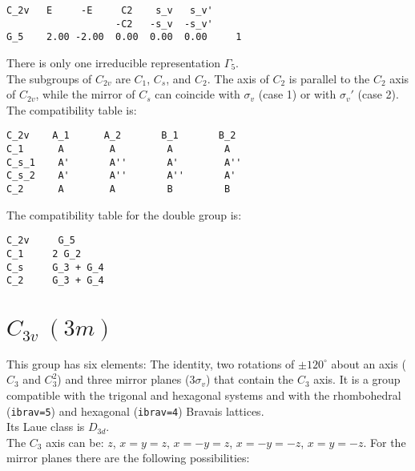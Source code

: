 \documentclass[12pt,a4paper,twoside]{report}
\begin{document}
\begin{tcolorbox}
\begin{footnotesize}
\begin{verbatim}
C_2v   E     -E     C2    s_v   s_v'
                   -C2   -s_v  -s_v'
G_5    2.00 -2.00  0.00  0.00  0.00     1
\end{verbatim}
\end{footnotesize}
\end{tcolorbox}

There is only one irreducible representation $\Gamma_5$. \\
The subgroups of $C_{2v}$ are $C_1$, $C_s$, and $C_2$. The axis of $C_2$ is 
parallel to the $C_2$ axis of $C_{2v}$, while the mirror of $C_s$ can coincide
with $\sigma_v$ (case 1) or with $\sigma_v'$ (case 2). \\
The compatibility table is:

\begin{tcolorbox}
\begin{footnotesize}
\begin{verbatim}
C_2v    A_1      A_2       B_1       B_2
C_1      A        A         A         A
C_s_1    A'       A''       A'        A''
C_s_2    A'       A''       A''       A'
C_2      A        A         B         B
\end{verbatim}
\end{footnotesize}
\end{tcolorbox}

The compatibility table for the double group is:

\begin{tcolorbox}
\begin{footnotesize}
\begin{verbatim}
C_2v     G_5
C_1     2 G_2
C_s     G_3 + G_4
C_2     G_3 + G_4
\end{verbatim}
\end{footnotesize}
\end{tcolorbox}

\newpage
{\color{coral}\section{$C_{3v}\ (3m)$}} 
\color{black}
This group has six elements: The identity, two rotations of $\pm120^\circ$ about
an axis ($C_3$ and $C_3^2$) and three mirror planes ($3\sigma_v$) 
that contain the $C_3$ axis.
It is a group compatible with the trigonal and hexagonal systems and with the  
rhombohedral (\texttt{ibrav=5}) and hexagonal (\texttt{ibrav=4}) Bravais lattices. \\ 
Its Laue class is $D_{3d}$. \\
The $C_3$ axis can be: $z$, $x=y=z$, $x=-y=z$, $x=-y=-z$, $x=y=-z$.
For the mirror planes there are the following possibilities:
\end{document}
